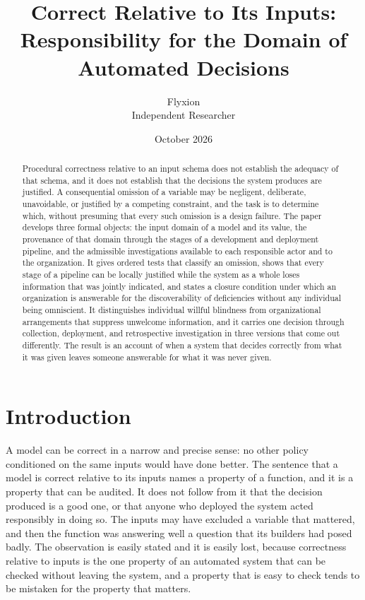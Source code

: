 \documentclass[11pt]{article}
\title{Correct Relative to Its Inputs:\\Responsibility for the Domain of Automated Decisions}
\author{Flyxion\\Independent Researcher}
\date{October 2026}
\theoremstyle{plain}
\theoremstyle{definition}
\begin{document}
\maketitle

\begin{abstract}
\noindent Procedural correctness relative to an input schema does not establish the adequacy of that schema, and it does not establish that the decisions the system produces are justified. A consequential omission of a variable may be negligent, deliberate, unavoidable, or justified by a competing constraint, and the task is to determine which, without presuming that every such omission is a design failure. The paper develops three formal objects: the input domain of a model and its value, the provenance of that domain through the stages of a development and deployment pipeline, and the admissible investigations available to each responsible actor and to the organization. It gives ordered tests that classify an omission, shows that every stage of a pipeline can be locally justified while the system as a whole loses information that was jointly indicated, and states a closure condition under which an organization is answerable for the discoverability of deficiencies without any individual being omniscient. It distinguishes individual willful blindness from organizational arrangements that suppress unwelcome information, and it carries one decision through collection, deployment, and retrospective investigation in three versions that come out differently. The result is an account of when a system that decides correctly from what it was given leaves someone answerable for what it was never given.
\end{abstract}

\section{Introduction}

A model can be correct in a narrow and precise sense: no other policy conditioned on the same inputs would have done better. The sentence that a model is correct relative to its inputs names a property of a function, and it is a property that can be audited. It does not follow from it that the decision produced is a good one, or that anyone who deployed the system acted responsibly in doing so. The inputs may have excluded a variable that mattered, and then the function was answering well a question that its builders had posed badly. The observation is easily stated and it is easily lost, because correctness relative to inputs is the one property of an automated system that can be checked without leaving the system, and a property that is easy to check tends to be mistaken for the property that matters.
\end{document}
